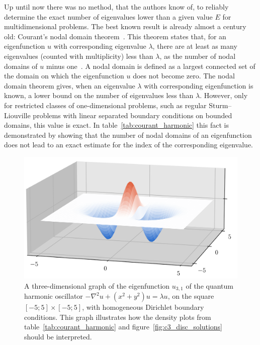 Up until now there was no method, that the authors know of, to reliably determine the exact number of eigenvalues lower than a given value $E$ for multidimensional problems. The best known result is already almost a century old: Courant's nodal domain theorem~\cite[Vol I, Chapter  VI, paragraph 2, Theorem 2]{courant_methods_2008}. This theorem states that, for an eigenfunction $u$ with corresponding eigenvalue $\lambda$, there are at least as many eigenvalues (counted with multiplicity) less than $\lambda$, as the number of nodal domains of $u$ minus one~\cite[Theorem 1.1]{berard_nodal_2014}. A nodal domain is defined as a largest connected set of the domain on which the eigenfunction $u$ does not become zero. The nodal domain theorem gives, when an eigenvalue $\lambda$ with corresponding eigenfunction is known, a lower bound on the number of eigenvalues less than $\lambda$. However, only for restricted classes of one-dimensional problems, such as regular Sturm--Liouville problems with linear separated boundary conditions on bounded domains, this value is exact. In table~\ref{tab:courant_harmonic} this fact is demonstrated by showing that the number of nodal domains of an eigenfunction does not lead to an exact estimate for the index of the corresponding eigenvalue.

\begin{figure}
  \begin{center}
    \includegraphics[width=\linewidth]{img/chapter3/counting/harmonic_3d.png}
    \caption{\label{fig:harmonic_3d} A three-dimensional graph of the eigenfunction $u_{3,1}$ of the quantum harmonic oscillator $-\nabla^2 u + (x^2+y^2) u = \lambda u$, on the square $[-5; 5] \times [-5; 5]$, with homogeneous Dirichlet boundary conditions. This graph illustrates how the density plots from table~\ref{tab:courant_harmonic} and figure~\ref{fig:c3_disc_solutions} should be interpreted.}
  \end{center}
\end{figure}

